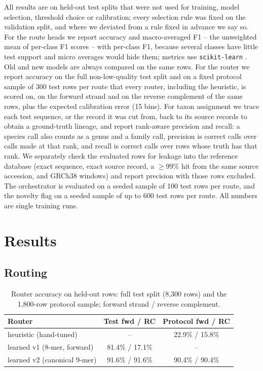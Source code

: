 \documentclass[conference]{IEEEtran}
\begin{document}
All results are on held-out test splits that were not used for training, model selection, threshold choice or calibration; every selection rule was fixed on the validation split, and where we deviated from a rule fixed in advance we say so. For the route heads we report accuracy and macro-averaged F1 -- the unweighted mean of per-class F1 scores -- with per-class F1, because several classes have little test support and micro averages would hide them; metrics use \texttt{scikit-learn} \cite{pedregosa2011sklearn}. Old and new models are always compared on the same rows. For the router we report accuracy on the full non-low-quality test split and on a fixed protocol sample of 300 test rows per route that every router, including the heuristic, is scored on, on the forward strand and on the reverse complement of the same rows, plus the expected calibration error (15 bins). For taxon assignment we trace each test sequence, or the record it was cut from, back to its source records to obtain a ground-truth lineage, and report rank-aware precision and recall: a species call also counts as a genus and a family call, precision is correct calls over calls made at that rank, and recall is correct calls over rows whose truth has that rank. We separately check the evaluated rows for leakage into the reference database (exact sequence, exact source record, a $\geq 99\%$ hit from the same source accession, and GRCh38 windows) and report precision with those rows excluded. The orchestrator is evaluated on a seeded sample of 100 test rows per route, and the novelty flag on a seeded sample of up to 600 test rows per route. All numbers are single training runs.

\section{Results}
\label{sec:results}

\subsection{Routing}

\begin{table}[t]
\centering
\caption{Router accuracy on held-out rows: full test split (8{,}300 rows) and the 1{,}800-row protocol sample; forward strand / reverse complement.}
\label{tab:router}
\begin{tabular}{@{}lcc@{}}
\toprule
Router & Test fwd / RC & Protocol fwd / RC \\
\midrule
heuristic (hand-tuned) & -- & 22.9\% / 15.8\% \\
learned v1 (8-mer, forward) & 81.4\% / 17.1\% & -- \\
learned v2 (canonical 9-mer) & 91.6\% / 91.6\% & 90.4\% / 90.4\% \\
\bottomrule
\end{tabular}
\end{table}
\end{document}
